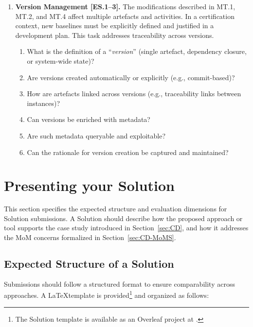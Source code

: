 \documentclass{article}
\begin{document}
\begin{enumerate}[label=\textbf{MT.\arabic*}, leftmargin=*]
   \item \textbf{Version Management [ES.1--3].}  
   The modifications described in MT.1, MT.2, and MT.4 affect multiple artefacts and activities. In a certification context, new baselines must be explicitly
   defined and justified in a development plan. This task addresses traceability 
   across versions.

   \begin{enumerate}[label=\textbf{\arabic*.}]
      \item What is the definition of a ``\emph{version}'' (single artefact, 
      dependency closure, or system-wide state)?
      \item Are versions created automatically or explicitly (e.g., commit-based)?
      \item How are artefacts linked across versions (e.g., traceability links 
      between instances)? 
      \item Can versions be enriched with metadata?
      \item Are such metadata queryable and exploitable?
      \item Can the rationale for version creation be captured and maintained?
   \end{enumerate}
\end{enumerate}






\section{Presenting your Solution}
\label{sec:CS}

This section specifies the expected structure and evaluation dimensions for Solution submissions. A Solution should describe how the proposed
approach or tool supports the case study introduced in
Section~\ref{sec:CD}, and how it addresses the MoM
concerns formalized in Section~\ref{sec:CD-MoMS}.

\subsection{Expected Structure of a Solution}
\label{sec:CS-Structure}

Submissions should follow a structured format to ensure comparability across
approaches. A \LaTeX template is provided\footnote{The Solution template is available as an Overleaf
project at \url{}.} and organized as follows:
\end{document}
